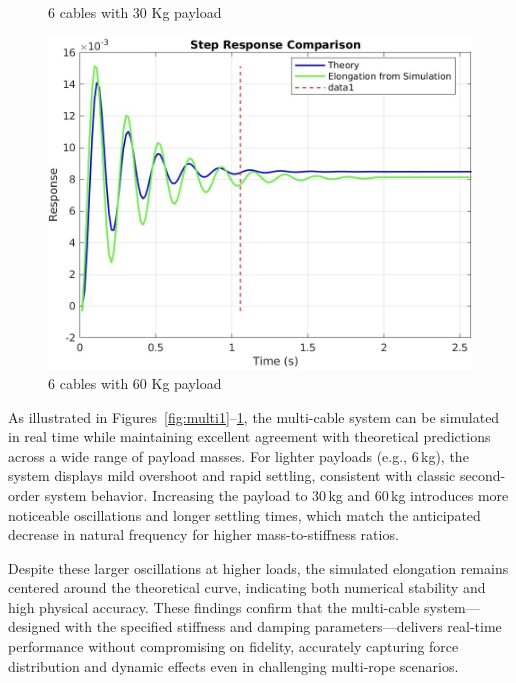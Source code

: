 \documentclass[12pt,twoside,letterpaper]{article}
\begin{document}
\begin{figure}[H]
\begin{minipage}{0.32\textwidth}
        \caption{6 cables with 30 Kg payload}
        \label{fig:multi2}
    \end{minipage}
    \hfill
    \begin{minipage}{0.32\textwidth}
        \centering
        \includegraphics[width=\linewidth]{figures/multi_60.jpg}
        \caption{6 cables with 60 Kg payload}
        \label{fig:multi3}
    \end{minipage}
\end{figure}

As illustrated in Figures~\ref{fig:multi1}--\ref{fig:multi3}, the multi-cable system can be simulated in real time while maintaining excellent agreement with theoretical predictions across a wide range of payload masses. For lighter payloads (e.g., 6\,kg), the system displays mild overshoot and rapid settling, consistent with classic second-order system behavior. Increasing the payload to 30\,kg and 60\,kg introduces more noticeable oscillations and longer settling times, which match the anticipated decrease in natural frequency for higher mass-to-stiffness ratios. 

Despite these larger oscillations at higher loads, the simulated elongation remains centered around the theoretical curve, indicating both numerical stability and high physical accuracy. These findings confirm that the multi-cable system—designed with the specified stiffness and damping parameters—delivers real-time performance without compromising on fidelity, accurately capturing force distribution and dynamic effects even in challenging multi-rope scenarios.
\end{document}
